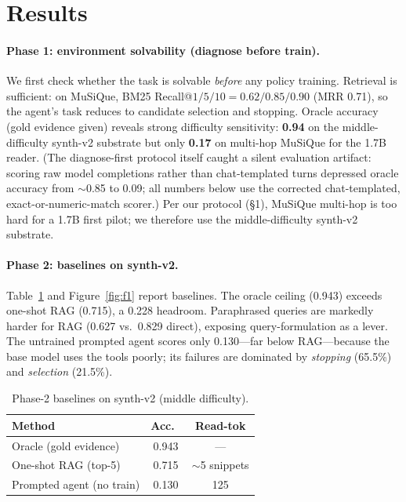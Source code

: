 \documentclass[10pt,twocolumn]{article}
\begin{document}
\section{Results}

\paragraph{Phase 1: environment solvability (diagnose before train).}
We first check whether the task is solvable \emph{before} any policy training. Retrieval is sufficient: on MuSiQue, BM25 Recall@$1/5/10 = 0.62/0.85/0.90$ (MRR 0.71), so the agent's task reduces to candidate selection and stopping. Oracle accuracy (gold evidence given) reveals strong difficulty sensitivity: \textbf{0.94} on the middle-difficulty synth-v2 substrate but only \textbf{0.17} on multi-hop MuSiQue for the 1.7B reader. (The diagnose-first protocol itself caught a silent evaluation artifact: scoring raw model completions rather than chat-templated turns depressed oracle accuracy from $\sim$0.85 to 0.09; all numbers below use the corrected chat-templated, exact-or-numeric-match scorer.) Per our protocol (\S1), MuSiQue multi-hop is too hard for a 1.7B first pilot; we therefore use the middle-difficulty synth-v2 substrate.

\paragraph{Phase 2: baselines on synth-v2.}
Table~\ref{tab:baselines} and Figure~\ref{fig:f1} report baselines. The oracle ceiling (0.943) exceeds one-shot RAG (0.715), a 0.228 headroom. Paraphrased queries are markedly harder for RAG (0.627 vs.\ 0.829 direct), exposing query-formulation as a lever. The untrained prompted agent scores only 0.130---far below RAG---because the base model uses the tools poorly; its failures are dominated by \emph{stopping} (65.5\%) and \emph{selection} (21.5\%).

\begin{table}[h]\centering\small
\caption{Phase-2 baselines on synth-v2 (middle difficulty).}\label{tab:baselines}
\begin{tabular}{lcc}\toprule
Method & Acc.\ & Read-tok \\\midrule
Oracle (gold evidence) & 0.943 & --- \\
One-shot RAG (top-5)   & 0.715 & $\sim$5 snippets \\
Prompted agent (no train) & 0.130 & 125 \\
\bottomrule\end{tabular}\end{table}
\end{document}
